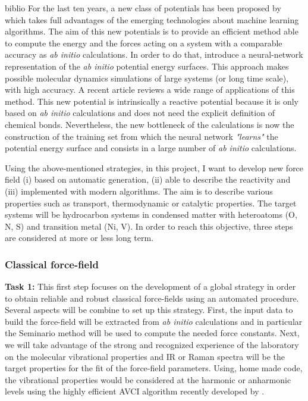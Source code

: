 \documentclass[11pt]{artuppax}
\newcounter{subsec}[section]
\begin{document}
\begin{btSect}{biblio}
For the last ten years, a new class of potentials has been proposed by \citet{behler2007} which takes full advantages of the emerging technologies about machine learning algorithms. The aim of this new potentials is to provide an efficient method able to compute the energy and the forces acting on a system with a comparable accuracy as \textit{ab initio} calculations. In order to do that, \citet{behler2007} introduce a neural-network representation of the \textit{ab initio} potential energy surfaces. This approach makes possible molecular dynamics simulations of large systems (or long time scale), with high accuracy. A recent article\cite{behler2017} reviews a wide range of applications of this method. This new potential is intrinsically a reactive potential because it is only based on \textit{ab initio} calculations and does not need the explicit definition of chemical bonds. Nevertheless, the new bottleneck of the calculations is now the construction of the training set from which the neural network \textit{"learns"} the potential energy surface and consists in a large number of \textit{ab initio} calculations.

Using the above-mentioned strategies, in this project, I want to develop new force field (i) based on automatic generation, (ii) able to describe the reactivity and (iii) implemented with modern algorithms. The aim is to describe various properties such as transport, thermodynamic or catalytic properties. The target systems will be hydrocarbon systems in condensed matter with heteroatoms (O, N, S) and transition metal (Ni, V). In order to reach this objective, three steps are considered at more or less long term.

\subsubsection{Classical force-field}

\textbf{Task 1:}
This first step focuses on the development of a global strategy in order to obtain reliable and robust classical force-fields using an automated procedure. Several aspects will be combine to set up this strategy. First, the input data to build the force-field will be extracted from \textit{ab initio} calculations and in particular the Seminario method\cite{nilsson2003} will be used to compute the needed force constants. Next, we will take advantage of the strong and recognized experience of the laboratory on the molecular vibrational properties and IR or Raman spectra will be the target properties for the fit of the force-field parameters. Using, home made code, the vibrational properties would be considered at the harmonic or anharmonic levels using the highly efficient AVCI algorithm recently developed by \citet{odunlami2017, garnier2016}.


\end{btSect}
\end{document}
